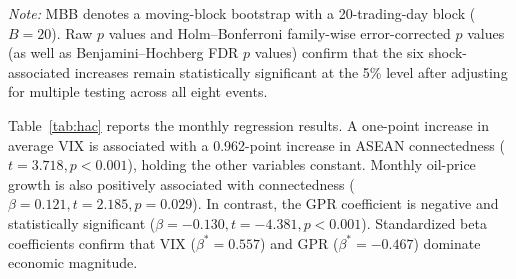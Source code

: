 \documentclass[12pt,a4paper]{article}
\begin{document}
\begin{table}[H]
\centering
\caption{Shock-associated changes in total connectedness}
\label{tab:events}
\begin{minipage}{0.92\textwidth}
\footnotesize\textit{Note:} MBB denotes a moving-block bootstrap with a 20-trading-day block ($B=20$). Raw $p$ values and Holm--Bonferroni family-wise error-corrected $p$ values (as well as Benjamini--Hochberg FDR $p$ values) confirm that the six shock-associated increases remain statistically significant at the 5\% level after adjusting for multiple testing across all eight events.
\end{minipage}
\end{table}

Table~\ref{tab:hac} reports the monthly regression results. A one-point increase in average VIX is associated with a 0.962-point increase in ASEAN connectedness ($t=3.718, p < 0.001$), holding the other variables constant. Monthly oil-price growth is also positively associated with connectedness ($\beta = 0.121, t=2.185, p = 0.029$). In contrast, the GPR coefficient is negative and statistically significant ($\beta = -0.130, t=-4.381, p < 0.001$). Standardized beta coefficients confirm that VIX ($\beta^* = 0.557$) and GPR ($\beta^* = -0.467$) dominate economic magnitude.
\end{document}

